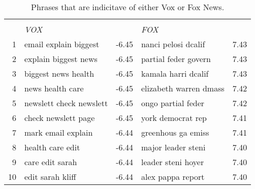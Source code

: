 \begin{table}[H]
\caption{Phrases that are indicitave of either Vox or Fox News.}
\label{tab:vox_fox}
\centering
\begin{tabular}{r||lr|lr}
  \hline \hline
  &        &        &         &        \\
 & \textit{VOX} &  & \textit{FOX} &  \\ 
  \hline
  1 & email explain biggest & -6.45 & nanci pelosi dcalif & 7.43 \\ 
  2 & explain biggest news & -6.45 & partial feder govern & 7.43 \\ 
  3 & biggest news health & -6.45 & kamala harri dcalif & 7.43 \\ 
  4 & news health care & -6.45 & elizabeth warren dmass & 7.42 \\ 
  5 & newslett check newslett & -6.45 & ongo partial feder & 7.42 \\ 
  6 & check newslett page & -6.45 & york democrat rep & 7.41 \\ 
  7 & mark email explain & -6.44 & greenhous ga emiss & 7.41 \\ 
  8 & health care edit & -6.44 & major leader steni & 7.40 \\ 
  9 & care edit sarah & -6.44 & leader steni hoyer & 7.40 \\ 
  10 & edit sarah kliff & -6.44 & alex pappa report & 7.40 \\ 
   \hline
\end{tabular}
\end{table}
